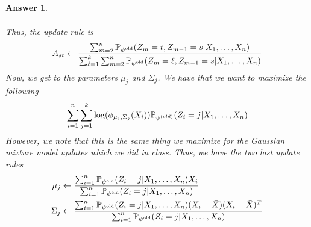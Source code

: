 \documentclass[12pt]{article}
\theoremstyle{colon}
\newtheorem*{answer}{Answer}
\begin{document}
\begin{answer}
\begin{enumerate}[label=\arabic*)]
\begin{gather*}
      \end{gather*}
      Thus, the update rule is
      \begin{gather*}
        A_{st} \leftarrow \frac{\sum_{m=2}^n \mathbb{P}_{\psi^{\text{old}}}(Z_m = t, Z_{m-1} = s | X_1, \mathellipsis, X_n)}{\sum_{\ell=1}^k \sum_{m=2}^n \mathbb{P}_{\psi^{\text{old}}}(Z_m = \ell, Z_{m-1} = s | X_1, \mathellipsis, X_n)}
      \end{gather*}
      Now, we get to the parameters $\mu_j$ and $\Sigma_j$. We have that we want to maximize the following
      \begin{gather*}
        \sum_{i=1}^n \sum_{j=1}^k \log (\phi_{\mu_j, \Sigma_j}(X_i)) \mathbb{P}_{\psi^{(old)}} (Z_i = j | X_1, \mathellipsis, X_n)
      \end{gather*}
      However, we note that this is the same thing we maximize for the Gaussian mixture model updates which we did in class. Thus, we have the two last update rules
      \begin{align*}
        \mu_j &\leftarrow \frac{\sum_{i=1}^n \mathbb{P}_{\psi^{\text{old}}}(Z_i = j | X_1, \mathellipsis, X_n)X_i}{\sum_{i=1}^n \mathbb{P}_{\psi^{\text{old}}}(Z_i = j | X_1, \mathellipsis, X_n)} \\
        \Sigma_j &\leftarrow \frac{\sum_{i=1}^n \mathbb{P}_{\psi^{\text{old}}}(Z_i = j | X_1, \mathellipsis, X_n)(X_i - \bar{X})(X_i - \bar{X})^T}{\sum_{i=1}^n \mathbb{P}_{\psi^{\text{old}}}(Z_i = j | X_1, \mathellipsis, X_n)}
      \end{align*}


\end{enumerate}
\end{answer}
\end{document}
